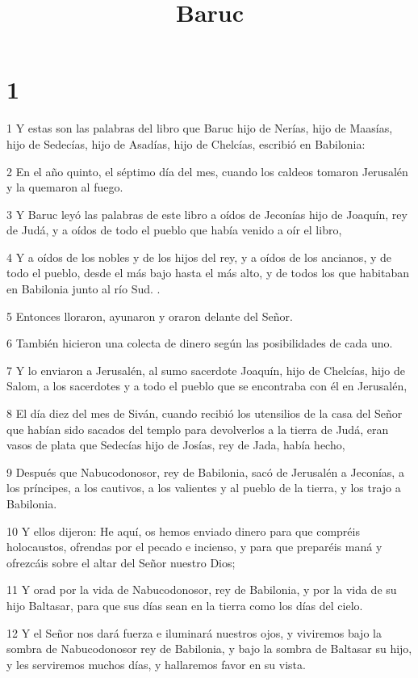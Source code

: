 

\title{Baruc}


\chapter{1}

\par 1 Y estas son las palabras del libro que Baruc hijo de Nerías, hijo de Maasías, hijo de Sedecías, hijo de Asadías, hijo de Chelcías, escribió en Babilonia:
\par 2 En el año quinto, el séptimo día del mes, cuando los caldeos tomaron Jerusalén y la quemaron al fuego.
\par 3 Y Baruc leyó las palabras de este libro a oídos de Jeconías hijo de Joaquín, rey de Judá, y a oídos de todo el pueblo que había venido a oír el libro,
\par 4 Y a oídos de los nobles y de los hijos del rey, y a oídos de los ancianos, y de todo el pueblo, desde el más bajo hasta el más alto, y de todos los que habitaban en Babilonia junto al río Sud. .
\par 5 Entonces lloraron, ayunaron y oraron delante del Señor.
\par 6 También hicieron una colecta de dinero según las posibilidades de cada uno.
\par 7 Y lo enviaron a Jerusalén, al sumo sacerdote Joaquín, hijo de Chelcías, hijo de Salom, a los sacerdotes y a todo el pueblo que se encontraba con él en Jerusalén,
\par 8 El día diez del mes de Siván, cuando recibió los utensilios de la casa del Señor que habían sido sacados del templo para devolverlos a la tierra de Judá, eran vasos de plata que Sedecías hijo de Josías, rey de Jada, había hecho,
\par 9 Después que Nabucodonosor, rey de Babilonia, sacó de Jerusalén a Jeconías, a los príncipes, a los cautivos, a los valientes y al pueblo de la tierra, y los trajo a Babilonia.
\par 10 Y ellos dijeron: He aquí, os hemos enviado dinero para que compréis holocaustos, ofrendas por el pecado e incienso, y para que preparéis maná y ofrezcáis sobre el altar del Señor nuestro Dios;
\par 11 Y orad por la vida de Nabucodonosor, rey de Babilonia, y por la vida de su hijo Baltasar, para que sus días sean en la tierra como los días del cielo.
\par 12 Y el Señor nos dará fuerza e iluminará nuestros ojos, y viviremos bajo la sombra de Nabucodonosor rey de Babilonia, y bajo la sombra de Baltasar su hijo, y les serviremos muchos días, y hallaremos favor en su vista.
